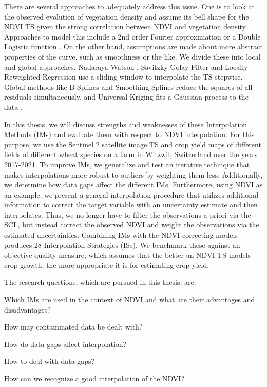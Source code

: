 There are several approaches to adequately address this issue. One is to look at the observed evolution of vegetation density and assume its bell shape for the NDVI {TS} given the strong correlation between NDVI and vegetation density. Approaches to model this include a 2nd order Fourier approximation \citep{stockliEuropeanPlantPhenology2004} or a Double Logistic function \citep{beckImprovedMonitoringVegetation2006}.
On the other hand, assumptions are made about more abstract properties of the curve, such as smoothness or the like. We divide these into local and global approaches. Nadaraya-Watson \citep{strbacEstimationEvapotrasnpirationUrban2017}, Savitzky-Golay Filter \citep{chenSimpleMethodReconstructing2004a} and Locally Reweighted Regression \citep{omoriAssessmentPaddyFields2021} use a sliding window to interpolate the {TS} stepwise. Global methods like B-Splines \citep{gurungPredictingEnhancedVegetation2009} and Smoothing Splines \citep{caiPerformanceSmoothingMethods2017} reduce the squares of all residuals simultaneously, and Universal Kriging fits a Gaussian process to the data \citep{chandolaScalableTimeSeries2010}.

In this thesis, we will discuss strengths and weaknesses of these Interpolation Methods ({{IM}}s) and evaluate them with respect to NDVI interpolation. For this purpose, we use the Sentinel 2 satellite image {TS} and crop yield maps of different fields of different wheat species on a farm in Witzwil, Switzerland over the years 2017-2021.
To improve {{IM}}s, we generalize and test an iterative technique that makes interpolations more robust to outliers by weighting them less. Additionally, we determine how data gaps affect the different {{IM}}s. Furthermore, using NDVI as an example, we present a general interpolation procedure that utilizes additional information to correct the target variable with an uncertainty estimate and then interpolates. Thus, we no longer have to filter the observations a priori via the SCL, but instead correct the observed NDVI and weight the observations via the estimated uncertainties. Combining {{IM}}s with the NDVI correcting models produces 28 Interpolation Strategies ({{ISs}}). We benchmark these against an objective quality measure, which assumes that the better an NDVI TS models crop growth, the more appropriate it is for estimating crop yield.

\bigskip
The research questions, which are pursued in this thesis, are:
\begin{Nenumerate}
    \item Which {{IM}}s are used in the context of NDVI and what are their advantages and disadvantages?
\item How may contaminated data be dealt with?
    \item How do data gaps affect interpolation?
\item How to deal with data gaps?
    \item How can we recognize a good interpolation of the NDVI?
\end{Nenumerate}
\bigskip

